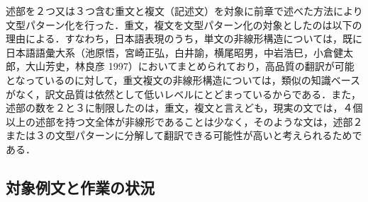 \documentclass{nlp}
\begin{document}
述部を２つ又は３つ含む重文と複文（記述文）を対象に前章で述べた方法により文型パターン化を行った．重文，複文を文型パターン化の対象としたのは以下の理由による．すなわち，日本語表現のうち，単文の非線形構造については，既に日本語語彙大系（池原悟，宮崎正弘，白井諭，横尾昭男，中岩浩巳，小倉健太郎，大山芳史，林良彦 1997）においてまとめられており，高品質の翻訳が可能となっているのに対して，重文複文の非線形構造については，類似の知識ベースがなく，訳文品質は依然として低いレベルにとどまっているからである．また，述部の数を２と３に制限したのは，重文，複文と言えども，現実の文では，４個以上の述部を持つ文全体が非線形であることは少なく，そのような文は，述部２または３の文型パターンに分解して翻訳できる可能性が高いと考えられるためである．

\subsection{対象例文と作業の状況}
\end{document}
